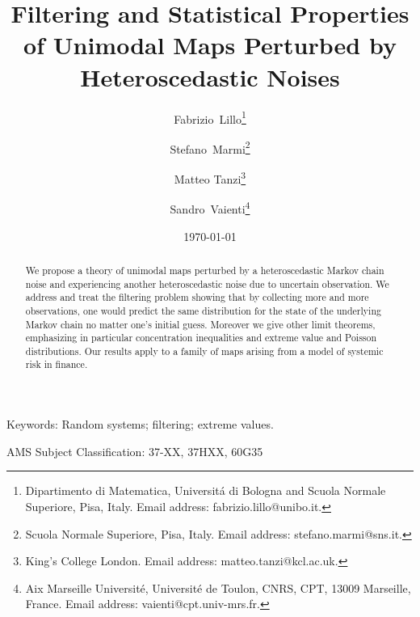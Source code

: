 \documentclass{article}
\title{ Filtering and Statistical Properties of Unimodal Maps Perturbed by Heteroscedastic Noises}
\author{Fabrizio~Lillo\thanks{Dipartimento di Matematica, Universit\'a di Bologna and Scuola Normale Superiore, Pisa, Italy. Email address: fabrizio.lillo@unibo.it.} 
\and Stefano~Marmi\thanks{Scuola Normale Superiore, Pisa, Italy. Email address: stefano.marmi@sns.it.} 
\and Matteo Tanzi\thanks{King's College London. Email address: matteo.tanzi@kcl.ac.uk.}
\and Sandro~Vaienti\thanks{Aix Marseille Universit\'e, Universit\'e de Toulon, CNRS, CPT, 13009 Marseille, France. Email address: vaienti@cpt.univ-mrs.fr.}}
\date{\today}
\newcommand{\1}{\mathbbm{1}}
\begin{document}
\maketitle
\begin{abstract}
We propose a theory of unimodal maps perturbed by a heteroscedastic Markov chain  noise
 and experiencing  another  heteroscedastic noise due to uncertain observation. We address and treat the filtering problem  showing that by collecting more and more observations, one would predict the same distribution for the state
of the underlying Markov chain no matter one’s initial guess. Moreover we   give other limit theorems, emphasizing in particular concentration inequalities and extreme value and Poisson distributions. Our results apply  to a   family of maps arising from a model of systemic risk in finance.
\end{abstract}

{Keywords: {Random systems; filtering; extreme values.}}

{{AMS Subject Classification: 37-XX, 37HXX, 60G35}}
\end{document}
